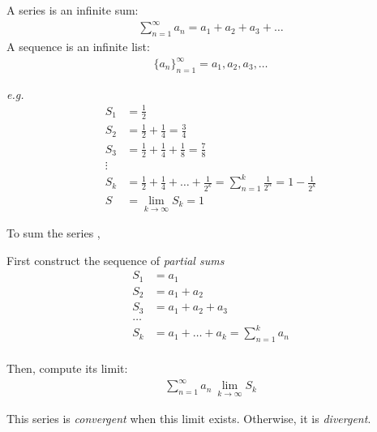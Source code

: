 \documentclass[../13.tex]{subfiles}
\begin{document}
A series is an infinite sum: \begin{align*}
    \sum_{n = 1}^{\infty} a_n = a_1 + a_2 + a_3 + \dots
\end{align*}
A sequence is an infinite list: \begin{align*}
    \{ a_n \}_{n=1}^\infty = a_1, a_2, a_3, \dots
\end{align*}

\emph{e.g.} 
\begin{align*}
    S_1 & = \frac{1}{2}                                                                                            \\
    S_2 & = \frac{1}{2} + \frac{1}{4} = \frac{3}{4}                                                                \\
    S_3 & = \frac{1}{2} + \frac{1}{4} + \frac{1}{8} = \frac{7}{8}                                                  \\
    \vdots                                                                                                         \\
    S_k & = \frac{1}{2} + \frac{1}{4} + \dots + \frac{1}{2^k} = \sum_{n = 1}^{k} \frac{1}{2^n} = 1 - \frac{1}{2^k} \\
    S   & =\lim_{k\to\infty} S_k = 1
\end{align*}

To sum the series , \begin{itemize}
    \begin{multicols}{2}

        \item First construct the sequence of \emph{partial sums}  \begin{align*}
            {S}_{1} & = {a}_{1}                                               \\
            {S}_{2} & = {a}_{1} + {a}_{2}                                     \\
            {S}_{3} & = {a}_{1} + {a}_{2} + {a}_{3}                           \\
            \dots                                                             \\
            {S}_{k} & = {a}_{1} +  \dots + {a}_{k} = \sum_{n = 1}^{k} {a}_{n} \\
        \end{align*}
        \item Then, compute its limit: \begin{align*}
            \sum_{n = 1}^{\infty} a_n \ \lim_{k\to\infty} S_k
        \end{align*}
    \end{multicols}
\end{itemize}
This series is \emph{convergent} when this limit exists. Otherwise, it is \emph{divergent}.
\newpage
\end{document}
